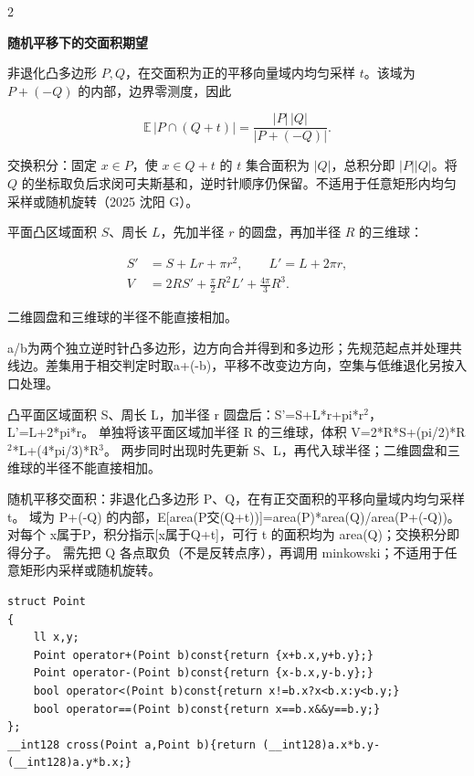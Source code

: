 \documentclass[UTF8,fontset=fandol,a4paper,twoside]{ctexart}
\newcommand{\topic}[1]{\par\smallskip\textbf{#1}\par\nobreak}
\newcommand{\note}[1]{{\fontsize{10}{12}\selectfont #1\par}}
\begin{document}
\begin{multicols}{2}
\topic{随机平移下的交面积期望}
\note{非退化凸多边形 $P,Q$，在交面积为正的平移向量域内均匀采样 $t$。该域为 $P+(-Q)$ 的内部，边界零测度，因此}
\[\mathbb E\,|P\cap(Q+t)|=\frac{|P|\,|Q|}{|P+(-Q)|}.\]
\note{交换积分：固定 $x\in P$，使 $x\in Q+t$ 的 $t$ 集合面积为 $|Q|$，总积分即 $|P||Q|$。将 $Q$ 的坐标取负后求闵可夫斯基和，逆时针顺序仍保留。不适用于任意矩形内均匀采样或随机旋转（2025 沈阳 G）。}
\note{平面凸区域面积 $S$、周长 $L$，先加半径 $r$ 的圆盘，再加半径 $R$ 的三维球：}
\begin{align*}
S'&=S+Lr+\pi r^2,\qquad L'=L+2\pi r,\\
V&=2RS'+\frac\pi2 R^2L'+\frac{4\pi}3R^3.
\end{align*}
\note{二维圆盘和三维球的半径不能直接相加。}

\note{a/\allowbreak{}b为两个独立逆时针凸多边形，边方向合并得到和多边形；先规范起点并处理共线边。差集用于相交判定时取a+\allowbreak{}(\allowbreak{}-\allowbreak{}b)\allowbreak{}，平移不改变边方向，空集与低维退化另按入口处理。}
\note{凸平面区域面积 S、周长 L，加半径 r 圆盘后：S'=\allowbreak{}S+\allowbreak{}L*r+\allowbreak{}pi*r\ensuremath{^2}，L'=\allowbreak{}L+\allowbreak{}2*pi*r。 单独将该平面区域加半径 R 的三维球，体积 V=\allowbreak{}2*R*S+\allowbreak{}(\allowbreak{}pi/\allowbreak{}2)\allowbreak{}*R\ensuremath{^2}*L+\allowbreak{}(\allowbreak{}4*pi/\allowbreak{}3)\allowbreak{}*R\ensuremath{^3}。 两步同时出现时先更新 S、L，再代入球半径；二维圆盘和三维球的半径不能直接相加。}
\note{随机平移交面积：非退化凸多边形 P、Q，在有正交面积的平移向量域内均匀采样 t。 域为 P+\allowbreak{}(\allowbreak{}-\allowbreak{}Q)\allowbreak{} 的内部，E[\allowbreak{}area(\allowbreak{}P交(\allowbreak{}Q+\allowbreak{}t)\allowbreak{})\allowbreak{}]\allowbreak{}=\allowbreak{}area(\allowbreak{}P)\allowbreak{}*area(\allowbreak{}Q)\allowbreak{}/\allowbreak{}area(\allowbreak{}P+\allowbreak{}(\allowbreak{}-\allowbreak{}Q)\allowbreak{})\allowbreak{}。 对每个 x属于P，积分指示[\allowbreak{}x属于Q+\allowbreak{}t]\allowbreak{}，可行 t 的面积均为 area(\allowbreak{}Q)\allowbreak{}；交换积分即得分子。 需先把 Q 各点取负（不是反转点序），再调用 minkowski；不适用于任意矩形内采样或随机旋转。}
\begin{lstlisting}
struct Point
{
    ll x,y;
    Point operator+(Point b)const{return {x+b.x,y+b.y};}
    Point operator-(Point b)const{return {x-b.x,y-b.y};}
    bool operator<(Point b)const{return x!=b.x?x<b.x:y<b.y;}
    bool operator==(Point b)const{return x==b.x&&y==b.y;}
};
__int128 cross(Point a,Point b){return (__int128)a.x*b.y-(__int128)a.y*b.x;}
\end{lstlisting}

\end{multicols}
\end{document}
